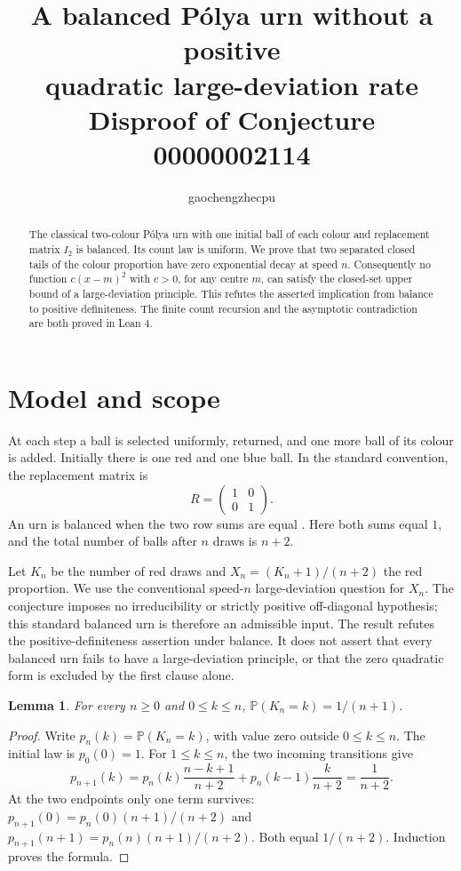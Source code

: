 \documentclass[11pt]{article}
\title{A balanced P\'olya urn without a positive\\quadratic large-deviation rate\\
\large Disproof of Conjecture 00000002114}
\author{gaochengzhecpu}\date{}
\newtheorem{lemma}{Lemma}
\begin{document}
\maketitle
\begin{abstract}
The classical two-colour P\'olya urn with one initial ball of each
colour and replacement matrix $I_2$ is balanced. Its count law is
uniform. We prove that two separated closed tails of the colour
proportion have zero exponential decay at speed $n$. Consequently
no function $c(x-m)^2$ with $c>0$, for any centre $m$, can satisfy
the closed-set upper bound of a large-deviation principle. This
refutes the asserted implication from balance to positive
definiteness. The finite count recursion and the asymptotic
contradiction are both proved in Lean 4.
\end{abstract}

\section*{Model and scope}
At each step a ball is selected uniformly, returned, and one more
ball of its colour is added. Initially there is one red and one
blue ball. In the standard convention, the replacement matrix is
\[
 R=\begin{pmatrix}1&0\\0&1\end{pmatrix}.
\]
An urn is balanced when the two row sums are equal
\cite[Section 1]{bmw}. Here both sums equal $1$, and the total
number of balls after $n$ draws is $n+2$.

Let $K_n$ be the number of red draws and
$X_n=(K_n+1)/(n+2)$ the red proportion. We use the conventional
speed-$n$ large-deviation question for $X_n$. The conjecture imposes
no irreducibility or strictly positive off-diagonal hypothesis;
this standard balanced urn is therefore an admissible input.
The result refutes the positive-definiteness assertion under
balance. It does not assert that every balanced urn fails to have
a large-deviation principle, or that the zero quadratic form is
excluded by the first clause alone.

\begin{lemma}\label{lem:law}
For every $n\geq0$ and $0\leq k\leq n$,
$\mathbb P(K_n=k)=1/(n+1)$.
\end{lemma}
\begin{proof}
Write $p_n(k)=\mathbb P(K_n=k)$, with value zero outside
$0\leq k\leq n$. The initial law is $p_0(0)=1$.
For $1\leq k\leq n$, the two incoming transitions give
\[
 p_{n+1}(k)=p_n(k)\frac{n-k+1}{n+2}
             +p_n(k-1)\frac{k}{n+2}
           =\frac{1}{n+2}.
\]
At the two endpoints only one term survives:
$p_{n+1}(0)=p_n(0)(n+1)/(n+2)$ and
$p_{n+1}(n+1)=p_n(n)(n+1)/(n+2)$.
Both equal $1/(n+2)$. Induction proves the formula.
\end{proof}
\end{document}

